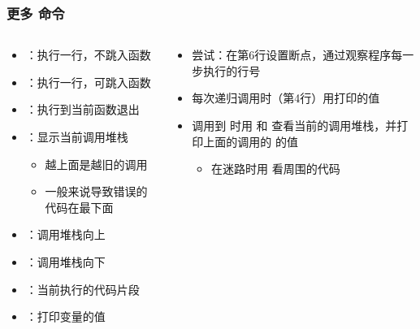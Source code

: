 \begin{frame} [fragile]
	\frametitle{更多  命令}
	\linespread{1.25}
	\begin{columns}[T]
		\begin{column}[T]{.5\textwidth}
			\begin{itemize}
			\item {}：执行一行，不跳入函数
			\item {}：执行一行，可跳入函数
			\item {}：执行到当前函数退出
			\item {}：显示当前调用堆栈
				\begin{itemize}
				\item 越上面是越旧的调用
				\item 一般来说导致错误的代码在最下面
				\end{itemize}
			\item {}：调用堆栈向上
			\item {}：调用堆栈向下
			\item {}：当前执行的代码片段
			\item {}：打印变量的值
			\end{itemize}
		\end{column}
		\begin{column}[T]{.5\textwidth}
			\begin{itemize}
			\item 尝试：在第6行设置断点，通过观察程序每一步执行的行号
			\item 每次递归调用时（第4行）用打印的值
			\item 调用到  时用  和
					 查看当前的调用堆栈，并打印上面的调用的
					 的值
				\begin{itemize}
				\item 在迷路时用  看周围的代码
				\end{itemize}
			\end{itemize}
		\end{column}
	\end{columns}
	\begin{comment}
	b 6
	r	# line 6
	s	# line 1
	s	# line 2
	p x	# 			4
	s	# line 4
	s	# line 1
	s	# line 2
	p x	# 			2
	s	# line 4
	s	# line 1
	s	# line 2
	p x	# 			0
	bt
	up	# line 4, stack -2
	p x	# 			2
	up	# line 4, stack -3
	p x	# 			6
	up	# line 6, stack -4
	l	# line 6
	\end{comment}
\end{frame}

